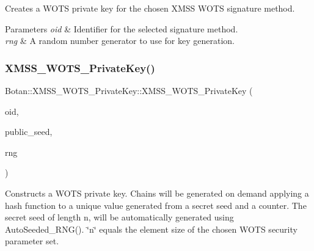 Creates a W\+O\+TS private key for the chosen X\+M\+SS W\+O\+TS signature method.


\begin{DoxyParams}{Parameters}
{\em oid} & Identifier for the selected signature method. \\
\hline
{\em rng} & A random number generator to use for key generation. \\
\hline
\end{DoxyParams}
\mbox{\label{class_botan_1_1_x_m_s_s___w_o_t_s___private_key_af1f9f24679ab1138032165f56cf3e9cd}} 
\subsubsection{\texorpdfstring{X\+M\+S\+S\+\_\+\+W\+O\+T\+S\+\_\+\+Private\+Key()}{XMSS\_WOTS\_PrivateKey()}\hspace{0.1cm}{\footnotesize\ttfamily [3/5]}}
{\footnotesize\ttfamily Botan\+::\+X\+M\+S\+S\+\_\+\+W\+O\+T\+S\+\_\+\+Private\+Key\+::\+X\+M\+S\+S\+\_\+\+W\+O\+T\+S\+\_\+\+Private\+Key (\begin{DoxyParamCaption}\item[{X\+M\+S\+S\+\_\+\+W\+O\+T\+S\+\_\+\+Parameters\+::ots\+\_\+algorithm\+\_\+t}]{oid,  }\item[{const secure\+\_\+vector$<$ uint8\+\_\+t $>$ \&}]{public\+\_\+seed,  }\item[{Random\+Number\+Generator \&}]{rng }\end{DoxyParamCaption})\hspace{0.3cm}{\ttfamily [inline]}}

Constructs a W\+O\+TS private key. Chains will be generated on demand applying a hash function to a unique value generated from a secret seed and a counter. The secret seed of length n, will be automatically generated using Auto\+Seeded\+\_\+\+R\+N\+G(). \char`\"{}n\char`\"{} equals the element size of the chosen W\+O\+TS security parameter set.


